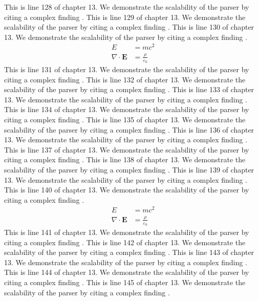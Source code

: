 This is line 128 of chapter 13. We demonstrate the scalability of the parser by citing a complex finding \cite{ref13_128}.
This is line 129 of chapter 13. We demonstrate the scalability of the parser by citing a complex finding \cite{ref13_129}.
This is line 130 of chapter 13. We demonstrate the scalability of the parser by citing a complex finding \cite{ref13_130}.
\begin{align*}
  E &= mc^2 \\
  \nabla \cdot \mathbf{E} &= \frac{\rho}{\varepsilon_0}
\end{align*}
This is line 131 of chapter 13. We demonstrate the scalability of the parser by citing a complex finding \cite{ref13_131}.
This is line 132 of chapter 13. We demonstrate the scalability of the parser by citing a complex finding \cite{ref13_132}.
This is line 133 of chapter 13. We demonstrate the scalability of the parser by citing a complex finding \cite{ref13_133}.
This is line 134 of chapter 13. We demonstrate the scalability of the parser by citing a complex finding \cite{ref13_134}.
This is line 135 of chapter 13. We demonstrate the scalability of the parser by citing a complex finding \cite{ref13_135}.
This is line 136 of chapter 13. We demonstrate the scalability of the parser by citing a complex finding \cite{ref13_136}.
This is line 137 of chapter 13. We demonstrate the scalability of the parser by citing a complex finding \cite{ref13_137}.
This is line 138 of chapter 13. We demonstrate the scalability of the parser by citing a complex finding \cite{ref13_138}.
This is line 139 of chapter 13. We demonstrate the scalability of the parser by citing a complex finding \cite{ref13_139}.
This is line 140 of chapter 13. We demonstrate the scalability of the parser by citing a complex finding \cite{ref13_140}.
\begin{align*}
  E &= mc^2 \\
  \nabla \cdot \mathbf{E} &= \frac{\rho}{\varepsilon_0}
\end{align*}
This is line 141 of chapter 13. We demonstrate the scalability of the parser by citing a complex finding \cite{ref13_141}.
This is line 142 of chapter 13. We demonstrate the scalability of the parser by citing a complex finding \cite{ref13_142}.
This is line 143 of chapter 13. We demonstrate the scalability of the parser by citing a complex finding \cite{ref13_143}.
This is line 144 of chapter 13. We demonstrate the scalability of the parser by citing a complex finding \cite{ref13_144}.
This is line 145 of chapter 13. We demonstrate the scalability of the parser by citing a complex finding \cite{ref13_145}.
